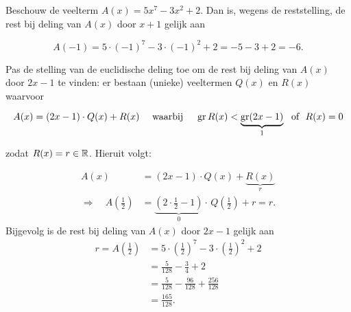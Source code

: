 \documentclass{ximera}
\begin{document}
\begin{example} 
Beschouw de veelterm \(A(x) = 5x^7 - 3x^2 + 2\). Dan is, wegens de reststelling, de rest bij deling van \(A(x)\) door \(x+1\) gelijk aan

\[
A(-1) = 5 \cdot (-1)^7 - 3 \cdot (-1)^2 + 2 = -5-3+2 = -6.
\]

Pas de stelling van de euclidische deling toe om de rest bij deling van \(A(x)\) door \(2x-1\) te vinden: er bestaan (unieke) veeltermen \(Q(x)\) en \(R(x)\) waarvoor

\[
A(x) = (2x-1)\cdot Q(x) + R(x) \quad \text{ waarbij } \quad \operatorname{gr} R(x) < \underbrace{\operatorname{gr} (2x-1)}_{1} \,\, \text{ of } \,\, R(x) = 0
\]

zodat \(R(x) = r \in \mathbb{R}\). Hieruit volgt:

\begin{align*}
A(x) & = (2x-1) \cdot Q(x) + \underbrace{R(x)}_{r} \\
\Rightarrow \quad A\left(\frac{1}{2}\right) & = \underbrace{\left(2 \cdot \frac{1}{2}-1\right)}_{0} \cdot \,Q\left(\frac{1}{2}\right) + r = r. 
\end{align*} 
Bijgevolg is de rest bij deling van \(A(x)\) door \(2x-1\) gelijk aan
\begin{align*}
r = A\left(\frac{1}{2}\right) & = 5 \cdot \left(\frac{1}{2}\right)^7 - 3 \cdot \left(\frac{1}{2}\right)^2 + 2 \\
& = \frac{5}{128} - \frac{3}{4} + 2 \\
& = \frac{5}{128} - \frac{96}{128} + \frac{256}{128} \\
& = \frac{165}{128}.
\end{align*}
\end{example} 
\end{document}
